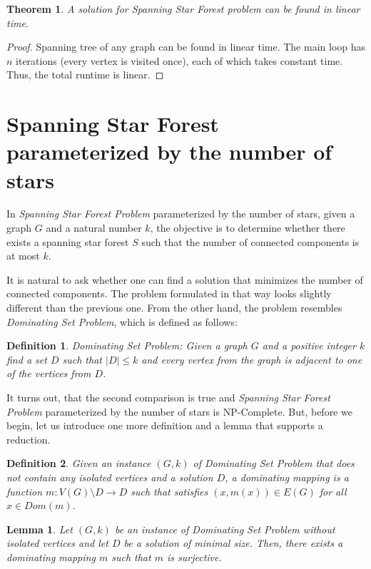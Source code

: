 \documentclass[en]{pracamgr}
\newtheorem{definition}{Definition}
\newtheorem{theorem}{Theorem}
\newtheorem{lemma}{Lemma}
\newcommand{\SSF}{Spanning Star Forest}
\newcommand{\ssf}{spanning star forest}
\newcommand{\domsetp}{\emph{Dominating Set Problem}}
\newcommand{\kssf}{\emph{Spanning Star Forest Problem} parameterized by the number of stars}
\begin{document}
\begin{theorem}
	A solution for {\sc \SSF{}} problem can be found in linear time.
\end{theorem}

\begin{proof}
	Spanning tree of any graph can be found in linear time. The main loop has $n$ 
	iterations (every vertex is visited once), each of which takes constant time.
	Thus, the total runtime is linear.
\end{proof}

\section{Spanning Star Forest parameterized by the number of stars}

In \kssf{}, given a graph $G$ and a natural number $k$, the objective is to determine whether there exists a \ssf{} $S$ such that the number of connected components is at most $k$.

It is natural to ask whether one can find a solution that minimizes the number of connected components. The problem formulated in that way looks slightly different than the previous one. From the other hand, the problem resembles \domsetp{}, which is defined as follows:

\begin{definition}
	\domsetp: Given a graph $G$ and a positive integer $k$ find a set $D$ such that $|D| \leq k$ and every vertex from the graph is adjacent to one of the vertices from $D$.
\end{definition}

It turns out, that the second comparison is true and \kssf{} is NP-Complete. But, before we begin, let us introduce one more definition and a lemma that supports a reduction.

\begin{definition}
	Given an instance $(G,k)$ of Dominating Set Problem that does not contain any isolated vertices and a solution $D$, a dominating mapping is a function $m:V(G) \setminus D \rightarrow D$ such that satisfies $(x,m(x)) \in E(G)$ for all $x \in Dom(m)$.
\end{definition}

\begin{lemma}\label{dom mapping}
	Let $(G,k)$ be an instance of \domsetp{} without isolated vertices and let $D$ be a solution of minimal size. Then, there exists a dominating mapping $m$ such that $m$ is surjective.
\end{lemma}
\end{document}
